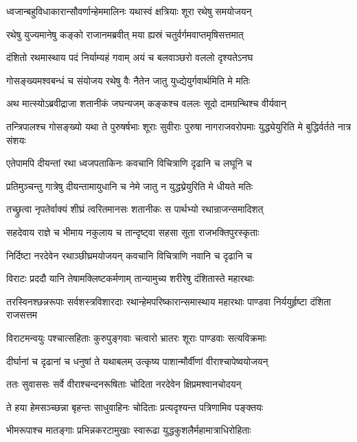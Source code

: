 \twolineshloka
{ध्वजान्बहुविधाकारान्सौवर्णान्हेममालिनः}
{यथास्वं क्षत्रियाः शूरा रथेषु समयोजयन्}


\twolineshloka
{रथेषु युज्यमानेषु कङ्को राजानमब्रवीत्}
{मया ह्यस्रं चतुर्वर्गमवाप्तमृषिसत्तमात्}


\twolineshloka
{दंशितो रथमास्थाय पदं निर्याम्यहं गवाम्}
{अयं च बलवाञ्छरो वललो दृश्यतेऽनघ}


\twolineshloka
{गोसङ्ख्यमश्वबन्धं च संयोजय रथेषु वैः}
{नैतेन जातु युध्द्येयुर्गवार्थमिति मे मतिः}



\twolineshloka
{अथ मात्स्योऽब्रवीद्राजा शतानीकं जघन्यजम्}
{कङ्कश्च वललः सूदो दामग्रन्थिश्च वीर्यवान्}


\threelineshloka
{तन्त्रिपालश्च गोसङ्ख्यो यथा ते पुरुषर्षभाः}
{शूराः सुवीराः पुरुषा नागराजवरोपमाः}
{युद्ध्येयुरिति मे बुद्धिर्वर्तते नात्र संशयः}


\twolineshloka
{एतेपामपि दीयन्तां रथा ध्वजपताकिनः}
{कवचानि विचित्राणि दृढानि च लघूनि च}


\twolineshloka
{प्रतिमुञ्चन्तु गात्रेषु दीयन्तामायुधानि च}
{नेमे जातु न युद्ध्य्रेयुरिति मे धीयते मतिः}



\twolineshloka
{तच्छ्रुत्वा नृपतेर्वाक्यं शीघ्रं त्वरितमानसः}
{शतानीकः स पार्थभ्यो रथान्राजन्समादिशत्}


\twolineshloka
{सहदेवाय राज्ञे च भीमाय नकुलाय च}
{तान्दृष्ट्वा सहसा सूता राजभक्तिपुरस्कृताः}


\twolineshloka
{निर्दिष्टा नरदेवेन रथाञ्छीघ्रमयोजयन्}
{कवचानि विचित्राणि नवानि च दृढानि च}


\twolineshloka
{विराटः प्रददौ यानि तेषामक्लिष्टकर्मणाम्}
{तान्यामुच्य शरीरेषु दंशितास्ते महारथाः}


\threelineshloka
{तरस्विनश्छन्नरूपाः सर्वशस्त्रविशारदाः}
{रथान्हेमपरिष्कारान्समास्थाय महारथाः}
{पाण्डवा निर्ययुर्हृष्टा दंशिता राजसत्तम}


\twolineshloka
{विराटमन्वयुः पश्चात्सहिताः कुरुपुङ्गवाः}
{चत्वारो भ्रातरः शूराः पाण्डवाः सत्यविक्रमाः}


\twolineshloka
{दीर्घानां च दृढानां च धनुषां ते यथाबलम्}
{उत्कृष्य पाशान्मौर्वीणां वीराश्चापेष्वयोजयन्}


\twolineshloka
{ततः सुवाससः सर्वे वीराश्चन्दनरूषिताः}
{चोदिता नरदेवेन क्षिप्रमश्वानचोदयन्}


\twolineshloka
{ते हया हेमसञ्च्छन्ना बृहन्तः साधुवाहिनः}
{चोदिताः प्रत्यदृश्यन्त पत्रिणामिव पङ्क्तयः}


\twolineshloka
{भीमरूपाश्च मातङ्गाः प्रभिन्नकरटामुखाः}
{स्वारूढा युद्धकुशलैर्महामात्राधिरोहिताः}



